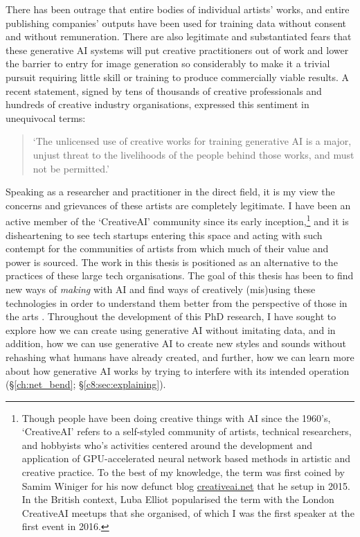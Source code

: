 There has been outrage that entire bodies of individual artists' works, and entire publishing companies' outputs have been used for training data without consent and without remuneration.
There are also legitimate and substantiated fears that these generative AI systems will put creative practitioners out of work and lower the barrier to entry for image generation so considerably to make it a trivial pursuit requiring little skill or training to produce commercially viable results.
A recent statement, signed by tens of thousands of creative professionals and hundreds of creative industry organisations, expressed this sentiment in unequivocal terms:

\begin{quote}
`The unlicensed use of creative works for training generative AI is a major, unjust threat to the livelihoods of the people behind those works, and must not be permitted.' \citep{aistatement2024}
\end{quote}

Speaking as a researcher and practitioner in the direct field, it is my view the concerns and grievances of these artists are completely legitimate. 
I have been an active member of the `CreativeAI' community since its early inception,\footnote{Though people have been doing creative things with AI since the 1960's, `CreativeAI' refers to a self-styled community of artists, technical researchers, and hobbyists who's activities centered around the development and application of GPU-accelerated neural network based methods in artistic and creative practice. To the best of my knowledge, the term was first coined by Samim Winiger for his now defunct blog \url{creativeai.net} that he setup in 2015. In the British context, Luba Elliot popularised the term with the London CreativeAI meetups that she organised, of which I was the first speaker at the first event in 2016.} and it is disheartening to see tech startups entering this space and acting with such contempt for the communities of artists from which much of their value and power is sourced. 
The work in this thesis is positioned as an alternative to the practices of these large tech organisations. 
The goal of this thesis has been to find new ways of \textit{making} with AI and find ways of creatively (mis)using these technologies in order to understand them better from the perspective of those in the arts \citep{salvaggio2023aarg}.
Throughout the development of this PhD research, I have sought to explore how we can create using generative AI without imitating data, and in addition, how we can use generative AI to create new styles and sounds without rehashing what humans have already created, and further, how we can learn more about how generative AI works by trying to interfere with its intended operation (\S \ref{ch:net_bend}; \S \ref{c8:sec:explaining}).


